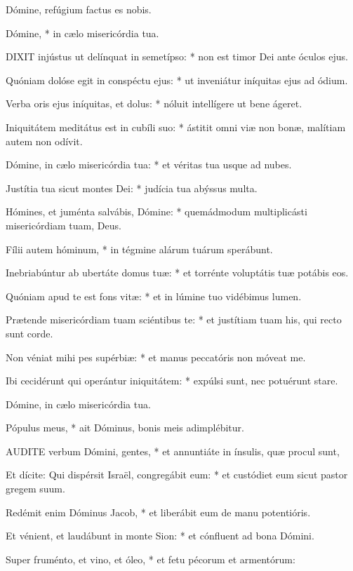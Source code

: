  Dómine, refúgium factus es nobis.

 Dómine, * in cælo misericórdia tua.


\lettrine[lines=2]{D}{IXIT} injústus ut delínquat in semetípso: * non est timor Dei ante óculos ejus.

Quóniam dolóse egit in conspéctu ejus: * ut inveniátur iníquitas ejus ad ódium.

Verba oris ejus iníquitas, et dolus: * nóluit intellígere ut bene ágeret.

Iniquitátem meditátus est in cubíli suo: * ástitit omni viæ non bonæ, malítiam autem non odívit.

Dómine, in cælo misericórdia tua: * et véritas tua usque ad nubes.

Justítia tua sicut montes Dei: * judícia tua abýssus multa.

Hómines, et juménta salvábis, Dómine: * quemádmodum multiplicásti misericórdiam tuam, Deus.

Fílii autem hóminum, * in tégmine alárum tuárum sperábunt.

Inebriabúntur ab ubertáte domus tuæ: * et torrénte voluptátis tuæ potábis eos.

Quóniam apud te est fons vitæ: * et in lúmine tuo vidébimus lumen.

Prætende misericórdiam tuam sciéntibus te: * et justítiam tuam his, qui recto sunt corde.

Non véniat mihi pes supérbiæ: * et manus peccatóris non móveat me.

Ibi cecidérunt qui operántur iniquitátem: * expúlsi sunt, nec potuérunt stare.

 Dómine, in cælo misericórdia tua.

 Pópulus meus, * ait Dóminus, bonis meis adimplébitur.


\lettrine[lines=2]{A}{UDITE} verbum Dómini, gentes, * et annuntiáte in ínsulis, quæ procul sunt,

Et dícite: Qui dispérsit Israël, congregábit eum: * et custódiet eum sicut pastor gregem suum.

Redémit enim Dóminus Jacob, * et liberábit eum de manu potentióris.

Et vénient, et laudábunt in monte Sion: * et cónfluent ad bona Dómini.

Super fruménto, et vino, et óleo, * et fetu pécorum et armentórum:

